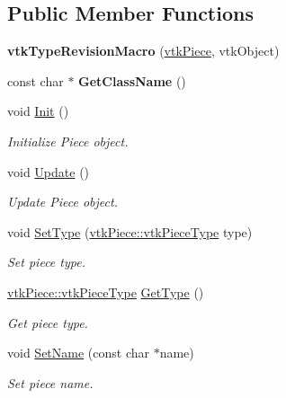 \subsection*{Public Member Functions}
\begin{DoxyCompactItemize}
\item 
\hypertarget{classvtkPiece_a9d6e4116e2d3d33de837b9d1f9e2ebb9}{
{\bfseries vtkTypeRevisionMacro} (\hyperlink{classvtkPiece}{vtkPiece}, vtkObject)}
\label{classvtkPiece_a9d6e4116e2d3d33de837b9d1f9e2ebb9}

\item 
\hypertarget{classvtkPiece_a8bb30be86adb24aa6901ed46b8297c8e}{
const char $\ast$ {\bfseries GetClassName} ()}
\label{classvtkPiece_a8bb30be86adb24aa6901ed46b8297c8e}

\item 
void \hyperlink{classvtkPiece_abe0c1a250c1bcae71f5513153d1bb395}{Init} ()
\begin{DoxyCompactList}\small\item\em Initialize Piece object. \item\end{DoxyCompactList}\item 
void \hyperlink{classvtkPiece_ac27cfcc5591305b572274c7f1d422fe8}{Update} ()
\begin{DoxyCompactList}\small\item\em Update Piece object. \item\end{DoxyCompactList}\item 
void \hyperlink{classvtkPiece_a19bed21306aacd30f7890ff6d364d025}{SetType} (\hyperlink{classvtkPiece_a50da923e79e96537b7676a68947aa858}{vtkPiece::vtkPieceType} type)
\begin{DoxyCompactList}\small\item\em Set piece type. \item\end{DoxyCompactList}\item 
\hyperlink{classvtkPiece_a50da923e79e96537b7676a68947aa858}{vtkPiece::vtkPieceType} \hyperlink{classvtkPiece_a337c7aa8f4c6a65cee2f436eedc29038}{GetType} ()
\begin{DoxyCompactList}\small\item\em Get piece type. \item\end{DoxyCompactList}\item 
void \hyperlink{classvtkPiece_ad7a95670a66a62e24e7685a6b8f6dafe}{SetName} (const char $\ast$name)
\begin{DoxyCompactList}\small\item\em Set piece name. \item\end{DoxyCompactList}\item 

\end{DoxyCompactItemize}
